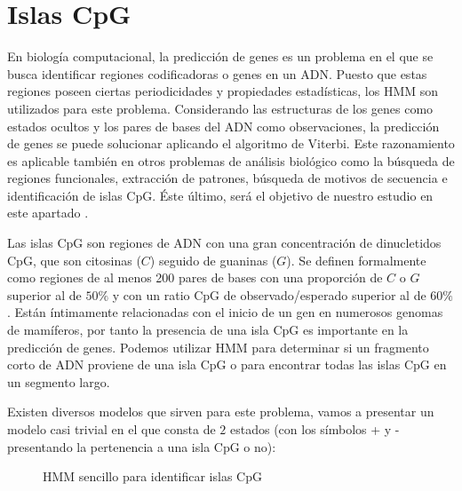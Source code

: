 \section{Islas CpG}
En biología computacional, la predicción de genes es un problema en el que se busca identificar regiones codificadoras o genes en un ADN. Puesto que estas regiones poseen ciertas periodicidades y propiedades estadísticas, los HMM son utilizados para este problema. Considerando las estructuras de los genes como estados ocultos y los pares de bases del ADN como observaciones, la predicción de genes se puede solucionar aplicando el algoritmo de Viterbi. Este razonamiento es aplicable también en otros problemas de análisis biológico como la búsqueda de regiones funcionales, extracción de patrones, búsqueda de motivos de secuencia e identificación de islas CpG. Éste último, será el objetivo de nuestro estudio en este apartado \cite{bioStudies}.

Las islas CpG son regiones de ADN con una gran concentración de dinucletidos CpG, que son citosinas ($C$) seguido de guaninas ($G$). Se definen formalmente como regiones de al menos 200 pares de bases con una proporción de $C$ o $G$ superior al de $50\%$ y con un ratio CpG de observado/esperado superior al de $60\%$. Están íntimamente relacionadas con el inicio de un gen en numerosos genomas de mamíferos, por tanto la presencia de una isla CpG es importante en la predicción de genes. Podemos utilizar HMM para determinar si un fragmento corto de ADN proviene de una isla CpG o para encontrar todas las islas CpG en un segmento largo.

Existen diversos modelos que sirven para este problema, vamos a presentar un modelo casi trivial en el que consta de $2$ estados (con los símbolos + y - presentando la pertenencia a una isla CpG o no):

\begin{figure}[H]
\centering
{}
\caption{HMM sencillo para identificar islas CpG}
\end{figure}


